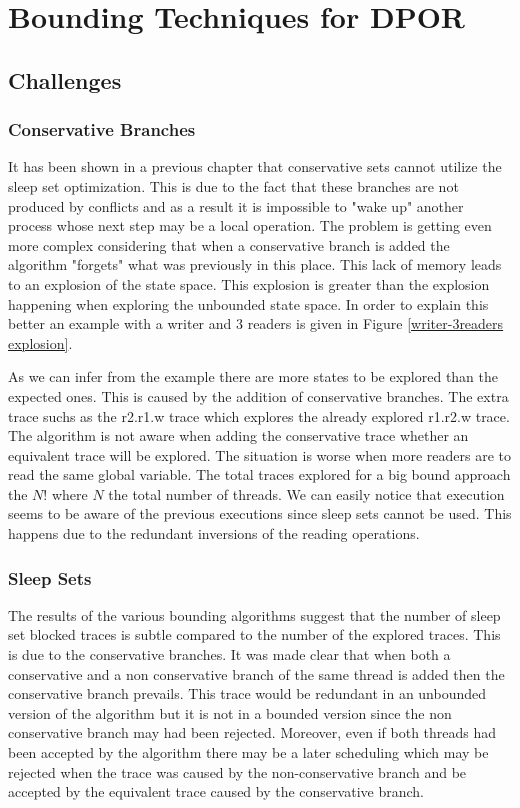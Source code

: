 \chapter{Bounding Techniques for DPOR}

\section{Challenges}

\subsection{Conservative Branches}
It has been shown in a previous chapter that conservative sets cannot utilize the sleep set optimization. This is due to the fact that these branches are not produced by conflicts
and as a result it is impossible to "wake up" another process whose next step may be a local operation. The problem is getting even more complex considering that when a conservative branch
is added the algorithm "forgets" what was previously in this place. This lack of memory leads to an explosion of the state space. This explosion is greater than
the explosion happening when exploring the unbounded state space. 
In order to explain this better an example with a writer and 3 readers is given in Figure \ref{writer-3readers explosion}.


As we can infer from the example there are more states to be explored than the expected ones. This is caused by the addition of conservative branches. 
The extra trace suchs as the r2.r1.w trace which explores the already explored r1.r2.w trace. The algorithm is not aware when adding the 
conservative trace whether an equivalent trace will be explored. The situation is worse when more readers are to read the same global variable.
The total traces explored for a big bound approach the $N!$ where $N$ the total number of threads. We can easily notice that execution seems to be aware of the previous executions since sleep sets cannot
be used. This happens due to the redundant inversions of the reading operations. 

\subsection{Sleep Sets}
The results of the various bounding algorithms suggest that the number of sleep set blocked traces is subtle compared to the number of the explored traces. This is due to the conservative
branches. It was made clear that when both a conservative and a non conservative branch of the same thread is added then the conservative branch prevails. This trace would be 
redundant in an unbounded version of the algorithm but it is not in a bounded version since the non conservative branch may had been rejected. Moreover, even if both threads had been accepted 
by the algorithm there may be a later scheduling which may be rejected when the trace was caused by the non-conservative branch and be accepted by the equivalent trace caused by the conservative
branch. 


